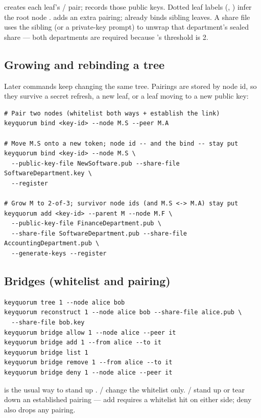  creates each leaf's  /  pair;
 records those public keys. Dotted leaf labels
(, ) infer the root node .  adds an extra pairing;  already binds sibling leaves.
A  share file uses the sibling  (or a private-key
prompt) to unwrap that department's sealed share --- both departments are
required because 's threshold is 2.

\subsection{Growing and rebinding a tree}

Later commands keep changing the same tree. Pairings are stored by node id,
so they survive a secret refresh, a new leaf, or a leaf moving to a new
public key:

\begin{lstlisting}
# Pair two nodes (whitelist both ways + establish the link)
keyquorum bind <key-id> --node M.S --peer M.A

# Move M.S onto a new token; node id -- and the bind -- stay put
keyquorum bind <key-id> --node M.S \
  --public-key-file NewSoftware.pub --share-file SoftwareDepartment.key \
  --register

# Grow M to 2-of-3; survivor node ids (and M.S <-> M.A) stay put
keyquorum add <key-id> --parent M --node M.F \
  --public-key-file FinanceDepartment.pub \
  --share-file SoftwareDepartment.pub --share-file AccountingDepartment.pub \
  --generate-keys --register
\end{lstlisting}

\subsection{Bridges (whitelist and pairing)}

\begin{lstlisting}
keyquorum tree 1 --node alice bob
keyquorum reconstruct 1 --node alice bob --share-file alice.pub \
  --share-file bob.key
keyquorum bridge allow 1 --node alice --peer it
keyquorum bridge add 1 --from alice --to it
keyquorum bridge list 1
keyquorum bridge remove 1 --from alice --to it
keyquorum bridge deny 1 --node alice --peer it
\end{lstlisting}

\code{bind --peer} is the usual way to stand up .
\code{bridge allow} /  change the whitelist only. \code{bridge
add} / \code{remove} stand up or tear down an established pairing --- add
requires a whitelist hit on either side; deny also drops any pairing.

